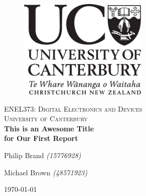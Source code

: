 \documentclass[12pt]{article}
\begin{document}
\begin{titlepage}
    \begin{center}
      \begin{figure}
        \includegraphics[right]{logo.png}
      \end{figure}
      \vspace*{1cm}
      \textsc{\large ENEL373: Digital Electronics and Devices}\\[0.5cm]
      \textsc{\Large University of Canterbury}\\[3.5cm]
      \linespread{1}
      {\Huge\bfseries This is an Awesome Title \\[0.3cm] for Our First Report} \\
      \vspace*{2cm}
      {\Huge Philip Brand \textit{\Large(15776928)}\\\par}
      {\Huge Michael Brown \textit{\Large(48571923)}\\\par}
      \vspace*{3cm}
      {\LARGE \today}
    \end{center}
  \end{titlepage}
\restoregeometry

\fancyhead{}
\fancyhead[R]{\small{\today}}





\renewcommand{\baselinestretch}{1.3}\normalsize
\setlength{\cftbeforesecskip}{0.3em}
\renewcommand{\cftsecleader}{\cftdotfill{\cftdotsep}}
\tableofcontents\thispagestyle{fancy}
\renewcommand{\baselinestretch}{1}\normalsize
\end{document}
